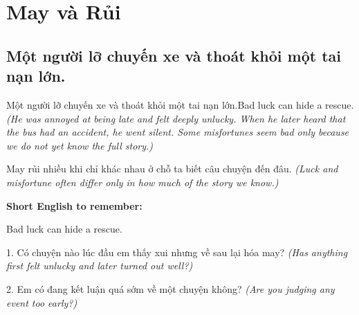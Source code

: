 \chapter{May và Rủi}

\section{Một người lỡ chuyến xe và thoát khỏi một tai nạn lớn.}
\begin{truyen}{Một người lỡ chuyến xe và thoát khỏi một tai nạn lớn.}{Bad luck can hide a rescue.}
\textit{(He was annoyed at being late and felt deeply unlucky. When he later heard that the bus had an accident, he went silent. Some misfortunes seem bad only because we do not yet know the full story.)}
\end{truyen}
\begin{baihoc}
May rủi nhiều khi chỉ khác nhau ở chỗ ta biết câu chuyện đến đâu.
\textit{(Luck and misfortune often differ only in how much of the story we know.)}
\end{baihoc}
\begin{ghinhoanh}
\textbf{Short English to remember:}

Bad luck can hide a rescue.
\end{ghinhoanh}
\begin{tuhocnhanh}
1. Có chuyện nào lúc đầu em thấy xui nhưng về sau lại hóa may? \textit{(Has anything first felt unlucky and later turned out well?)}

2. Em có đang kết luận quá sớm về một chuyện không? \textit{(Are you judging any event too early?)}
\end{tuhocnhanh}
\ngancach

